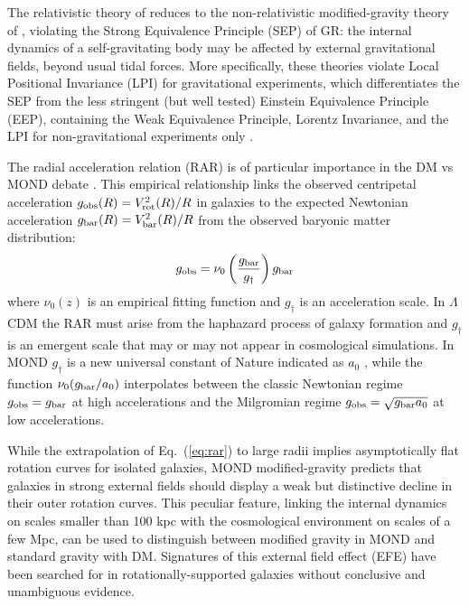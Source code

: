 \documentclass[twocolumn,tighten]{aastex63}
\begin{document}
The relativistic theory of \cite{Skor20} reduces to the non-relativistic modified-gravity theory of \cite{BM84}, violating the Strong Equivalence Principle (SEP) of GR: the internal dynamics of a self-gravitating body may be affected by external gravitational fields, beyond usual tidal forces. More specifically, these theories violate Local Positional Invariance (LPI) for gravitational experiments, which differentiates the SEP from the less stringent (but well tested) Einstein Equivalence Principle (EEP), containing the Weak Equivalence Principle, Lorentz Invariance, and the LPI for non-gravitational experiments only \citep{Will14}.

The radial acceleration relation (RAR) is of particular importance in the DM vs MOND debate \citep{MLS,Lel17}. This empirical relationship links the observed centripetal acceleration $g_{\rm obs}(R)=V^2_{\rm rot}(R)/R$ in galaxies to the expected Newtonian acceleration $g_{\rm bar}(R) =V^2_{\rm bar}(R)/R$ from the observed baryonic matter distribution:
\begin{equation}
  g_{\rm obs} = \nu_0 \left(\dfrac{g_{\rm bar}}{g_\dagger}\right) g_{\rm bar}
  \label{eq:rar}
\end{equation}
where $\nu_0(z)$ is an empirical fitting function and $g_\dagger$ is an acceleration scale. In $\Lambda$CDM the RAR must arise from the haphazard process of galaxy formation \citep{DCL16, Des17, Nav17, KW17} and $g_\dagger$ is an emergent scale that may \citep{Lud17} or may not\citep{Ten18} appear in cosmological simulations. In MOND $g_\dagger$ is a new universal constant of Nature indicated as $a_0$ \citep{Mil83}, while the function $\nu_0(g_{\rm bar}/a_0)$ interpolates between the classic Newtonian regime $g_{\rm obs} = g_{\rm bar}$ at high accelerations and the Milgromian regime $g_{\rm obs} = \sqrt{g_{\rm bar}a_0}$ at low accelerations. 

While the extrapolation of Eq.~(\ref{eq:rar}) to large radii implies asymptotically flat rotation curves for isolated galaxies, MOND modified-gravity \citep{BM84} predicts that galaxies in strong external fields should display a weak but distinctive decline in their outer rotation curves. This peculiar feature, linking the internal dynamics on scales smaller than 100 kpc with the cosmological environment on scales of a few Mpc, can be used to distinguish between modified gravity in MOND and standard gravity with DM. Signatures of this external field effect (EFE) have been searched for in rotationally-supported galaxies \citep{Hag16,WK15,Lel15} without conclusive and unambiguous evidence.
\end{document}
